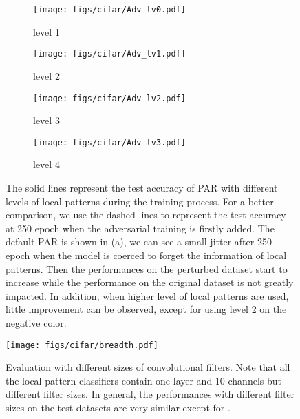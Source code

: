 \documentclass{article}
\begin{document}
\begin{figure}[h!]
  \centering
    \begin{subfigure}{.49\textwidth}
      \centering
      \texttt{[image: figs/cifar/Adv\_lv0.pdf]}
      \caption{level 1}
      \label{process}
    \end{subfigure}
    \begin{subfigure}{.49\textwidth}
      \centering
      \texttt{[image: figs/cifar/Adv\_lv1.pdf]}
      \caption{level 2}
    \end{subfigure}
    \begin{subfigure}{.49\textwidth}
      \centering
      \texttt{[image: figs/cifar/Adv\_lv2.pdf]}
      \caption{level 3}
    \end{subfigure}
    \begin{subfigure}{.49\textwidth}
      \centering
      \texttt{[image: figs/cifar/Adv\_lv3.pdf]}
      \caption{level 4}
    \end{subfigure}
\caption{The solid lines represent the test accuracy of PAR with different levels of local patterns during the training process. For a better comparison, we use the dashed lines to represent the test accuracy at 250 epoch when the adversarial training is firstly added. The default PAR is shown in (a), we can see a small jitter after 250 epoch when the model is coerced to forget the information of local patterns. Then the performances on the perturbed dataset start to increase while the performance on the original dataset is not greatly impacted. In addition, when higher level of local patterns are used, little improvement can be observed, except for using level 2 on the negative color.}
\label{fig:higher}
\end{figure}


\begin{figure}[!h]
    \centering
    \texttt{[image: figs/cifar/breadth.pdf]}
    \caption{Evaluation with different sizes of convolutional filters. Note that all the local pattern classifiers contain one layer and 10 channels but different filter sizes. In general, the performances with different filter sizes on the test datasets are very similar except for .}
    \label{fig:breath}
\end{figure}

\clearpage
\end{document}

